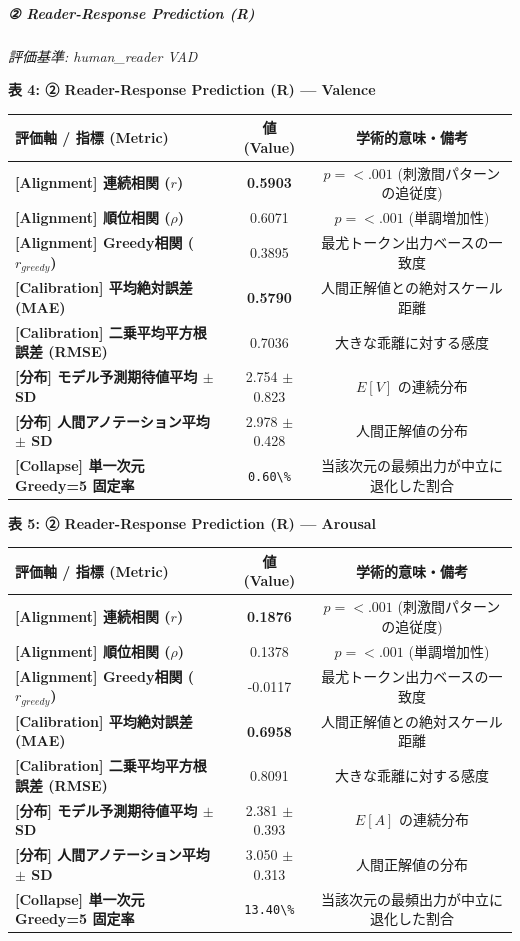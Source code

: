 \subparagraph{② Reader-Response Prediction (R)}
\textit{評価基準: human\_reader VAD}

\textbf{表 4: ② Reader-Response Prediction (R) — Valence}
\begin{center}
\small
\begin{tabular}{lcc}
\toprule
\textbf{評価軸 / 指標 (Metric)} & \textbf{値 (Value)} & \textbf{学術的意味・備考} \\
\midrule
\textbf{[Alignment] 連続相関 ($r$)} & \textbf{0.5903} & $p = <.001 $ (刺激間パターンの追従度) \\
\textbf{[Alignment] 順位相関 ($\rho$)} & 0.6071 & $p = <.001 $ (単調増加性) \\
\textbf{[Alignment] Greedy相関 ($r_{greedy}$)} & 0.3895 & 最尤トークン出力ベースの一致度 \\
\textbf{[Calibration] 平均絶対誤差 (MAE)} & \textbf{0.5790} & 人間正解値との絶対スケール距離 \\
\textbf{[Calibration] 二乗平均平方根誤差 (RMSE)} & 0.7036 & 大きな乖離に対する感度 \\
\textbf{[分布] モデル予測期待値平均 $\pm$ SD} & 2.754 $\pm$ 0.823 & $E[V]$ の連続分布 \\
\textbf{[分布] 人間アノテーション平均 $\pm$ SD} & 2.978 $\pm$ 0.428 & 人間正解値の分布 \\
\textbf{[Collapse] 単一次元 Greedy=5 固定率} & \texttt{0.60\textbackslash{}\%} & 当該次元の最頻出力が中立に退化した割合 \\
\bottomrule
\end{tabular}
\end{center}


\textbf{表 5: ② Reader-Response Prediction (R) — Arousal}
\begin{center}
\small
\begin{tabular}{lcc}
\toprule
\textbf{評価軸 / 指標 (Metric)} & \textbf{値 (Value)} & \textbf{学術的意味・備考} \\
\midrule
\textbf{[Alignment] 連続相関 ($r$)} & \textbf{0.1876} & $p = <.001 $ (刺激間パターンの追従度) \\
\textbf{[Alignment] 順位相関 ($\rho$)} & 0.1378 & $p = <.001 $ (単調増加性) \\
\textbf{[Alignment] Greedy相関 ($r_{greedy}$)} & -0.0117 & 最尤トークン出力ベースの一致度 \\
\textbf{[Calibration] 平均絶対誤差 (MAE)} & \textbf{0.6958} & 人間正解値との絶対スケール距離 \\
\textbf{[Calibration] 二乗平均平方根誤差 (RMSE)} & 0.8091 & 大きな乖離に対する感度 \\
\textbf{[分布] モデル予測期待値平均 $\pm$ SD} & 2.381 $\pm$ 0.393 & $E[A]$ の連続分布 \\
\textbf{[分布] 人間アノテーション平均 $\pm$ SD} & 3.050 $\pm$ 0.313 & 人間正解値の分布 \\
\textbf{[Collapse] 単一次元 Greedy=5 固定率} & \texttt{13.40\textbackslash{}\%} & 当該次元の最頻出力が中立に退化した割合 \\
\bottomrule
\end{tabular}
\end{center}


